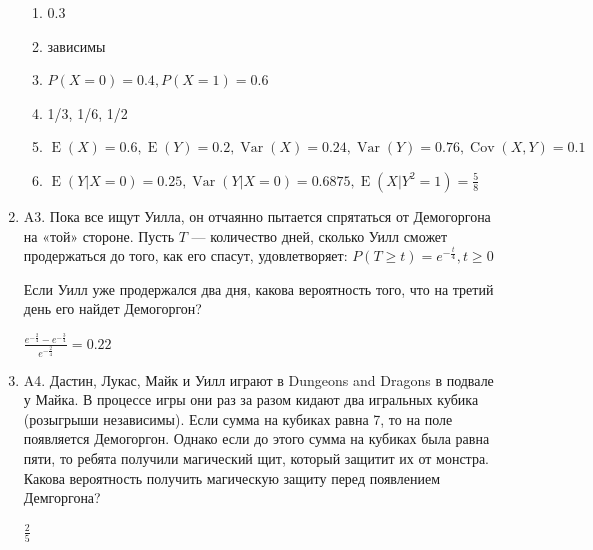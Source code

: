 \documentclass[12pt]{article}
\DeclareMathOperator{\Cov}{Cov}
\DeclareMathOperator{\Var}{Var}
\DeclareMathOperator{\E}{E}
\def \P{P}
\newenvironment{problem}{}{}
\newenvironment{sol}{}{} %
\begin{document}
\begin{enumerate}
\begin{problem}
\begin{sol}
\begin{enumerate}
\item $0.3$ 
\item зависимы 
\item $\P(X=0) = 0.4, \P(X=1) = 0.6$ 
\item 1/3, 1/6, 1/2 
\item $\E(X)=0.6, \E(Y)=0.2, \Var(X) = 0.24, \Var(Y) = 0.76, \Cov(X,Y) = 0.1$ 
\item $\E(Y| X=0)=0.25, \Var(Y| X=0)=0.6875, \E(X| Y^2=1)=\frac{5}{8}$
\end{enumerate}
\end{sol}
\end{problem}

\begin{problem}
\item[A3.] Пока все ищут Уилла, он отчаянно пытается спрятаться от Демогоргона на «той» стороне. Пусть $T$ — количество дней, сколько Уилл сможет продержаться до того, как его спасут, удовлетворяет: $\P(T \geq t) = e^{-\frac{t}{4}}, t \geq 0$

Если Уилл уже продержался два дня, какова вероятность того, что на третий день его найдет Демогоргон?

\begin{sol}
$\frac{e^{-\frac{2}{4}}-e^{-\frac{3}{4}}}{e^{-\frac{2}{4}} }= 0.22$
\end{sol}
\end{problem}

\begin{problem}
\item[A4.] Дастин, Лукас, Майк и Уилл играют в Dungeons and Dragons в подвале у Майка. В процессе игры они раз за разом кидают два игральных кубика (розыгрыши независимы). Если сумма на кубиках равна 7, то на поле появляется Демогоргон. Однако если до этого сумма на кубиках была равна пяти, то ребята получили магический щит, который защитит их от монстра. Какова вероятность получить магическую защиту перед появлением Демгоргона? 

\begin{sol}
$\frac{2}{5}$
\end{sol}
\end{problem}


\end{enumerate}
\end{document}
